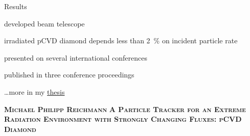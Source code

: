 \begin{frame}{Results}\centering
%
  \begin{tbox}[.7]
    \item developed beam telescope
    \item irradiated pCVD diamond depends less than \SI{2}{\percent} on incident particle rate
    \item presented on several international conferences
    \item published in three conference proceedings
    \item \ldots more in my \href{https://doi.org/10.3929/ethz-b-000611857}{thesis}
  \end{tbox}
  \setsansfont{Lato}
  \begin{center}
    \begin{tcolorbox}[colback=red!5!white, colframe=white!70!red, width=.92\textwidth, arc=4mm, halign=center, valign=center]
      \textbf{\textsc{Michael Philipp Reichmann}}
      \tcblower
      \huge\centering
      \textcolor{chapter-color}{\textbf{\textsc{A Particle Tracker for an Extreme Radiation Environment with Strongly Changing Fluxes: pCVD Diamond}}}
    \end{tcolorbox}
  \end{center}
%
\end{frame}
